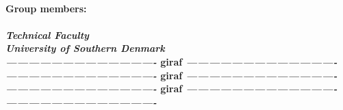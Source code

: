 \begin{center}
  \Large
  \color{ColorOthers}
   \\
  \vspace{6mm}
  \color{Gray}
  \normalsize
  \bfseries{Group members:} \\
  \Large
  \color{ColorOthers}
   \\
  \vspace{12mm}
  \normalsize
  \textsl{Technical Faculty} \\
  \textsl{University of Southern Denmark} \\ 
  \vspace{5mm}
  \normalsize
  \color{black}
  \textsl{----------------------------------------} \color{white} giraf \color{black}\textsl{----------------------------------------} \\
  \textsl{----------------------------------------}\color{white} giraf \color{black}\textsl{ ----------------------------------------} \\
  \textsl{----------------------------------------}\color{white} giraf \color{black}\textsl{ ----------------------------------------} \\
  \textsl{----------------------------------------} \\
\end{center}